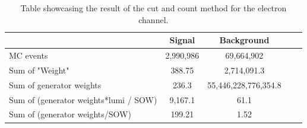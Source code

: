 \documentclass[14pt, a4paper]{book}
\begin{document}
\clearpage
\begin{table}[!h]
   \centering
   \begin{tabular}{l|c|c|c|r}\midrule\midrule
                                                & Signal     & Background \\\midrule
        MC events                               & 2,990,986  & 69,664,902 \\
        Sum of "Weight"                         & 388.75     & 2,714,091.3 \\
        Sum of generator weights                & 236.3      & 55,446,228,776,354.8 \\
        Sum of (generator weights*lumi / SOW)   & 9,167.1    & 61.1 \\
        Sum of (generator weights/SOW)          & 199.21    & 1.52 \\\midrule\midrule
   \end{tabular}
   \caption[Cut and count significance ee]{Table showcasing the result of the cut and count method for the electron channel.}
   \label{tab:cutsigee}
\end{table}
\end{document}
